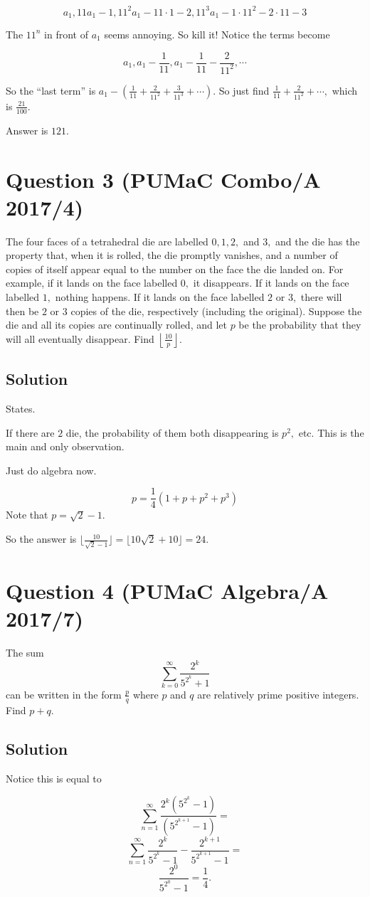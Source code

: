 \documentclass{article}
\begin{document}
\[a_1,11a_1-1,11^2a_1-11 \cdot 1-2,11^3a_1-1\cdot 11^2-2\cdot 11-3\]

The $11^n$ in front of $a_1$ seems annoying. So kill it! Notice the terms become

\[a_1,a_1-\frac{1}{11},a_1-\frac{1}{11}-\frac{2}{11^2},\cdots\]

So the ``last term'' is $a_1-(\frac{1}{11}+\frac{2}{11^2}+\frac{3}{11^3}+\cdots).$ So just find $\frac{1}{11}+\frac{2}{11^2}+\cdots,$ which is $\frac{21}{100}.$

Answer is $121.$

\pagebreak\section{Question 3 (PUMaC Combo/A 2017/4)}

The four faces of a tetrahedral die are labelled $0, 1, 2,$ and $3,$ and the die has the property that, when it is rolled, the die promptly vanishes, and a number of copies of itself appear equal to the number on the face the die landed on. For example, if it lands on the face labelled $0,$ it disappears. If it lands on the face labelled $1,$ nothing happens. If it lands on the face labelled $2$ or $3,$ there will then be $2$ or $3$ copies of the die, respectively (including the original). Suppose the die and all its copies are continually rolled, and let $p$ be the probability that they will all eventually disappear. Find $\left\lfloor \frac{10}{p} \right\rfloor$.

\subsection{Solution}

States.

If there are $2$ die, the probability of them both disappearing is $p^2,$ etc. This is the main and only observation.

Just do algebra now.

\[p=\frac{1}{4}(1+p+p^2+p^3)\]
Note that $p=\sqrt{2}-1.$

So the answer is $\lfloor\frac{10}{\sqrt{2}-1}\rfloor=\lfloor10\sqrt{2}+10\rfloor=24.$

\pagebreak\section{Question 4 (PUMaC Algebra/A 2017/7)}

The sum
    \[\sum_{k=0}^{\infty} \frac{2^{k}}{5^{2^{k}}+1}\]
    can be written in the form $\frac{p}{q}$ where $p$ and $q$ are relatively prime positive integers. Find $p+q$.

\subsection{Solution}

Notice this is equal to

\[\sum\limits_{n=1}^{\infty}\frac{2^k(5^{2^k}-1)}{(5^{2^{k+1}}-1)}=\]
\[\sum\limits_{n=1}^{\infty}\frac{2^k}{5^{2^k}-1}-\frac{2^{k+1}}{5^{2^{k+1}}-1}=\]
\[\frac{2^0}{5^{2^0}-1}=\frac{1}{4}.\]
\end{document}

